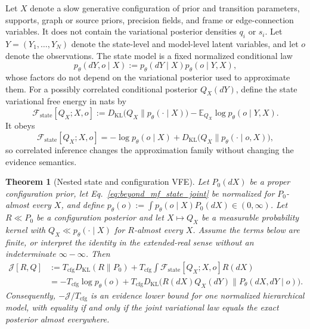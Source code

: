 \documentclass[11pt]{article}
\newtheorem{theorem}{Theorem}
\begin{document}
Let $X$ denote a slow generative configuration of prior and transition parameters, supports, graph or source priors, precision fields, and frame or edge-connection variables. It does not contain the variational posterior densities $q_i$ or $s_i$. Let $Y=(Y_1,\ldots,Y_N)$ denote the state-level and model-level latent variables, and let $o$ denote the observations. The state model is a fixed normalized conditional law
\begin{equation}
p_\theta(dY,o\mid X)
:=p_\theta(dY\mid X)p_\theta(o\mid Y,X),
\label{eq:beyond_mf_state_joint}
\end{equation}
whose factors do not depend on the variational posterior used to approximate them. For a possibly correlated conditional posterior $Q_X(dY)$, define the state variational free energy in nats by
\begin{equation}
\mathcal{F}_{\mathrm{state}}[Q_X;X,o]
:=D_{\mathrm{KL}}\bigl(Q_X\|p_\theta(\cdot\mid X)\bigr)
-\mathbb{E}_{Q_X}\log p_\theta(o\mid Y,X).
\label{eq:beyond_mf_state_vfe}
\end{equation}
It obeys
\begin{equation}
\mathcal{F}_{\mathrm{state}}[Q_X;X,o]
=-\log p_\theta(o\mid X)
+D_{\mathrm{KL}}\bigl(Q_X\|p_\theta(\cdot\mid o,X)\bigr),
\label{eq:beyond_mf_state_elbo_identity}
\end{equation}
so correlated inference changes the approximation family without changing the evidence semantics.

\begin{theorem}[Nested state and configuration VFE]
\label{thm:nested_state_configuration_vfe}
Let $P_0(dX)$ be a proper configuration prior, let Eq.~\eqref{eq:beyond_mf_state_joint} be normalized for $P_0$-almost every $X$, and define $p_\theta(o):=\int p_\theta(o\mid X)P_0(dX)\in(0,\infty)$. Let $R\ll P_0$ be a configuration posterior and let $X\mapsto Q_X$ be a measurable probability kernel with $Q_X\ll p_\theta(\cdot\mid X)$ for $R$-almost every $X$. Assume the terms below are finite, or interpret the identity in the extended-real sense without an indeterminate $\infty-\infty$. Then
\begin{align}
\mathcal{J}[R,Q]
&:=T_{\mathrm{cfg}}D_{\mathrm{KL}}(R\|P_0)
+T_{\mathrm{cfg}}\int
\mathcal{F}_{\mathrm{state}}[Q_X;X,o]R(dX)
\nonumber\\
&=-T_{\mathrm{cfg}}\log p_\theta(o)
+T_{\mathrm{cfg}}D_{\mathrm{KL}}
\bigl(R(dX)Q_X(dY)\|P_\theta(dX,dY\mid o)\bigr).
\label{eq:nested_state_configuration_identity}
\end{align}
Consequently, $-\mathcal{J}/T_{\mathrm{cfg}}$ is an evidence lower bound for one normalized hierarchical model, with equality if and only if the joint variational law equals the exact posterior almost everywhere.
\end{theorem}
\end{document}
